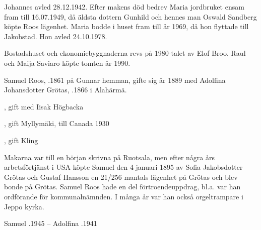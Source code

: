 Johannes avled 28.12.1942. Efter makens död bedrev Maria jordbruket ensam fram till 16.07.1949, då äldsta dottern Gunhild och hennes man Oswald Sandberg köpte Roos lägenhet. Maria bodde i huset fram till år 1969, då hon flyttade till Jakobstad. Hon avled 24.10.1978.

Bostadshuset och ekonomiebyggnaderna revs på 1980-talet av Elof Broo. Raul och Maija Saviaro köpte tomten år 1990.


Samuel Roos, .1861 på Gunnar hemman, gifte sig år 1889 med Adolfina Johansdotter Grötas, .1866 i Alahärmä.
\begin{jhchildren}
  \item {}, gift med Iisak Högbacka
  \item {}
  \item {}
  \item {}
  \item {}, gift Myllymäki, till Canada 1930
  \item {}, gift Kling
  \item {}
  \item {}
  \item {}
\end{jhchildren}
Makarna var till en början skrivna på Ruotsala, men efter några års	arbetsförtjänst i USA köpte Samuel den 4 januari 1895 av Sofia Jakobsdotter Grötas och Gustaf Hansson en 21/256 mantals lägenhet	på Grötas och blev bonde på Grötas. Samuel Roos hade en del förtroendeuppdrag, bl.a. var han ordförande för kommunalnämnden. I många år var han också orgeltrampare i Jeppo kyrka.

Samuel .1945  --  Adolfina .1941


